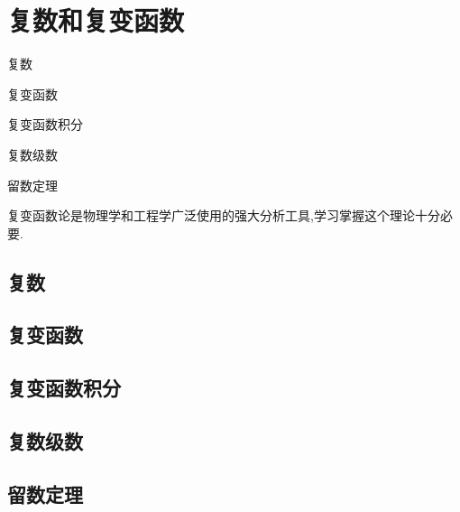 


\chapter{复数和复变函数}
\begin{introduction}
\item 复数
\item 复变函数
\item 复变函数积分
\item 复数级数
\item 留数定理
\end{introduction}

复变函数论是物理学和工程学广泛使用的强大分析工具,学习掌握这个理论十分必要.
\section{复数}

\section{复变函数}

\label{sec:complexfunctions}





\section{复变函数积分}



\section{复数级数}




% 

\section{留数定理}

